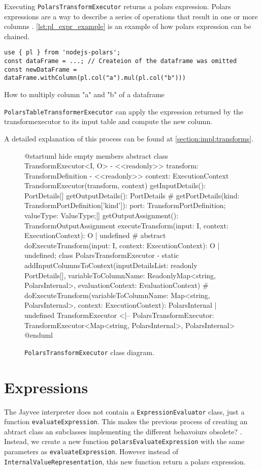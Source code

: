 Executing \Verb|PolarsTransformExecutor| returns a polars expression.
Polars expressions are a way to describe a series of operations that result in one or more columns \autocite{polars:docs:expr}.
\ref{lst:pl_expr_example} is an example of how polars expression can be chained.
\begin{listing}
	\begin{verbatim}
use { pl } from 'nodejs-polars';
const dataFrame = ...; // Createion of the dataframe was omitted
const newDataFrame = dataFrame.withColumn(pl.col("a").mul(pl.col("b")))
	\end{verbatim}
	\caption{How to multiply column "a" and "b" of a dataframe}
	\label{lst:pl_expr_example}
\end{listing}
\Verb|PolarsTableTransformerExecutor| can apply the expression returned by the transformexecutor to its input table and compute the new column.

A detailed explanation of this process can be found at \ref{section:impl:transforms}.

\begin{figure}
	\begin{plantuml}
		@startuml
		hide empty members
		abstract class TransformExecutor<I, O> {
		- <<readonly>> transform: TransformDefinition
		- <<readonly>> context: ExecutionContext
		TransformExecutor(transform, context)
		getInputDetails(): PortDetails[]
		getOutputDetails(): PortDetails
		# getPortDetails(kind: TransformPortDefinition['kind']): { port: TransformPortDefinition; valueType: ValueType;}[]
		getOutputAssignment(): TransformOutputAssignment
		executeTransform(input: I, context: ExecutionContext): O | undefined
		# {abstract} doExecuteTransform(input: I, context: ExecutionContext): O | undefined;
		}
		class PolarsTransformExecutor  {
		- {static} addInputColumnsToContext(inputDetailsList: readonly PortDetails[], variableToColumnName: ReadonlyMap<string, PolarsInternal>, evaluationContext: EvaluationContext)
		# doExecuteTransform(variableToColumnName: Map<string, PolarsInternal>, context: ExecutionContext): PolarsInternal | undefined
		}
		TransformExecutor <|-- PolarsTransformExecutor: TransformExecutor<Map<string, PolarsInternal>, PolarsInternal>
		@enduml
	\end{plantuml}
	\caption{\Verb|PolarsTransformExecutor| class diagram.}
	\label{fig:uml:transformexecutor}
\end{figure}

\section{Expressions}
\label{section:expressions}
The Jayvee interpreter does not contain a \Verb|ExpressionEvaluator| class, just a function \Verb|evaluateExpression|.
This makes the previous process of creating an abtract class an subclasses implementing the different behavoiurs obsolete? %
.
Instead, we create a new function \Verb|polarsEvaluateExpression| with the same parameters as \Verb|evaluateExpression|.
However instead of \Verb|InternalValueRepresentation|, this new function return a polars expression.

